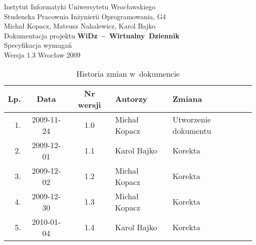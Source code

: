 \documentclass[12pt,leqno,twoside]{mwart}
\begin{document}
\begin{titlepage}
\begin{center}
Instytut Informatyki Uniwersytetu Wrocławskiego \\
Studencka Pracownia Inżynierii Oprogramowania, G4 \\
\vspace{4cm}
\Large Michał Kopacz, Mateusz Nahalewicz, Karol Bajko \\
\vspace{0.5cm}
\huge Dokumentacja projektu \mbox{\textbf{WiDz -- Wirtualny Dziennik}} \\ \Large Specyfikacja wymagań\\
\vspace{1cm}
\normalsize Wersja 1.3
\vfill
\normalsize Wrocław 2009
\end{center}
\end{titlepage}

\newpage

\begin{table}
	\centering
	\caption{Historia zmian w~dokumencie}
		\begin{tabular}{|r|c|c|l|l|}
		\hline
		Lp. 	& Data       & Nr wersji 	& Autorzy           		& Zmiana \\ \hline
		1.   	& 2009-11-24 & 1.0       	& Michał Kopacz & Utworzenie dokumentu \\ \hline
		2.	& 2009-12-01 & 1.1			& Karol Bajko & Korekta	\\ \hline
		3.	& 2009-12-02 & 1.2			& Michał Kopacz & Korekta	\\ \hline
		4.	& 2009-12-30 & 1.3			& Michał Kopacz & Korekta	\\ \hline
		5.	& 2010-01-04 & 1.4			& Karol Bajko	& Korekta	\\ \hline
		\end{tabular}
\end{table}

\newpage

\tableofcontents

\newpage
\end{document}
